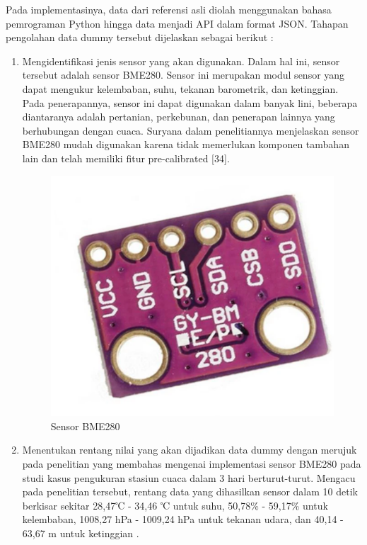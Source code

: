 \begin{enumerate}[label={\alph*.}]
	Pada implementasinya, data dari referensi asli diolah menggunakan bahasa pemrograman Python hingga data menjadi API dalam format JSON. Tahapan pengolahan data dummy tersebut dijelaskan sebagai berikut : \\
	\begin{enumerate}[label={\arabic*.}]
		\item Mengidentifikasi jenis sensor yang akan digunakan. Dalam hal ini, sensor tersebut adalah sensor BME280. Sensor ini merupakan modul sensor yang dapat mengukur kelembaban, suhu, tekanan barometrik, dan ketinggian. Pada penerapannya, sensor ini dapat digunakan dalam banyak lini, beberapa diantaranya adalah pertanian, perkebunan, dan penerapan lainnya yang berhubungan dengan cuaca. Suryana dalam penelitiannya menjelaskan sensor BME280 mudah digunakan karena tidak memerlukan komponen tambahan lain dan telah memiliki fitur pre-calibrated [34].
		\begin{figure}[H]
			\centering
			\includegraphics[width=0.8\linewidth]{gambar/Dasar teori/Sensor BME280.png}
			\caption{Sensor BME280}
			\label{gambar1}
		\end{figure}
		
		\item Menentukan rentang nilai yang akan dijadikan data dummy dengan merujuk pada penelitian yang membahas mengenai implementasi sensor BME280 pada studi kasus pengukuran stasiun cuaca dalam 3 hari berturut-turut. Mengacu pada penelitian tersebut, rentang data yang dihasilkan sensor dalam 10 detik berkisar sekitar 28,47℃ - 34,46 ℃ untuk suhu, 50,78\% - 59,17\% untuk kelembaban, 1008,27 hPa - 1009,24 hPa untuk tekanan udara, dan 40,14 - 63,67 m untuk ketinggian \cite{Triawan2023}. 
		

\end{enumerate}
\end{enumerate}
